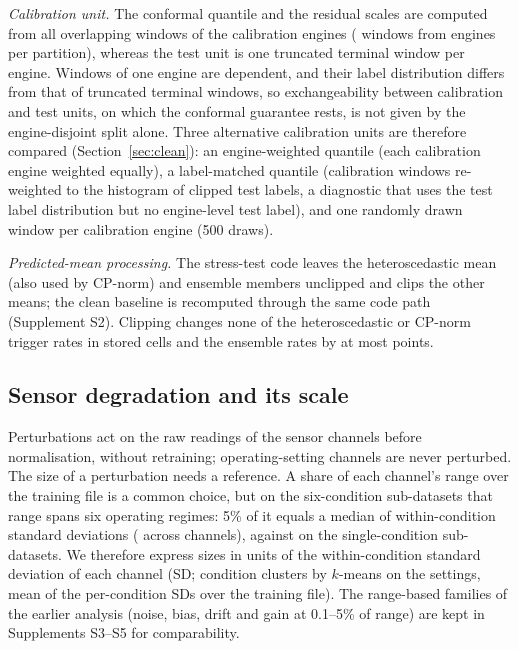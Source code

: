 \emph{Calibration unit.} The conformal quantile and the residual scales are computed from all overlapping windows of the calibration engines (\RVCalWin{} windows from \RVCalEng{} engines per partition), whereas the test unit is one truncated terminal window per engine. Windows of one engine are dependent, and their label distribution differs from that of truncated terminal windows, so exchangeability between calibration and test units, on which the conformal guarantee rests,\cite{barber2023} is not given by the engine-disjoint split alone. Three alternative calibration units are therefore compared (Section~\ref{sec:clean}): an engine-weighted quantile (each calibration engine weighted equally), a label-matched quantile (calibration windows re-weighted to the histogram of clipped test labels, a diagnostic that uses the test label distribution but no engine-level test label), and one randomly drawn window per calibration engine (500 draws).

\emph{Predicted-mean processing.} The stress-test code leaves the heteroscedastic mean (also used by CP-norm) and ensemble members unclipped and clips the other means; the clean baseline is recomputed through the same code path (Supplement S2). Clipping changes none of the heteroscedastic or CP-norm trigger rates in \JClipRateN{} stored cells and the ensemble rates by at most \JClipRateMaxEns{} points.

\subsection{Sensor degradation and its scale}\label{sec:pert}
Perturbations act on the raw readings of the sensor channels before normalisation, without retraining; operating-setting channels are never perturbed. The size of a perturbation needs a reference. A share of each channel's range over the training file is a common choice, but on the six-condition sub-datasets that range spans six operating regimes: 5\% of it equals a median of \RVRatioSix{} within-condition standard deviations (\RVRatioSixRange{} across channels), against \RVRatioSingle{} on the single-condition sub-datasets. We therefore express sizes in units of the within-condition standard deviation of each channel (SD; condition clusters by $k$-means on the settings, mean of the per-condition SDs over the training file). The range-based families of the earlier analysis (noise, bias, drift and gain at 0.1--5\% of range) are kept in Supplements S3--S5 for comparability.

